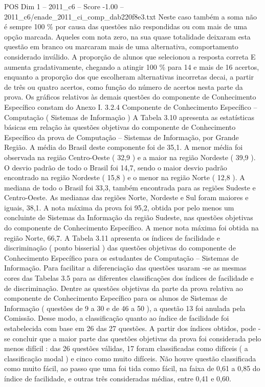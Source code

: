 \begin{textsample}{POS Dim 1 – 2011\_c6 – Score -1.00 – 2011\_c6/enade\_2011\_ci\_comp\_dab220f8e3.txt}
Neste caso também a soma não é sempre 100 \% por causa das questões não respondidas ou com mais de uma opção marcada.
Aqueles com nota zero, na sua quase totalidade deixaram esta questão em branco ou marcaram mais de uma alternativa, comportamento considerado inválido.
A proporção de alunos que selecionou a resposta correta E aumenta gradativamente, chegando a atingir 100 \% para 14 e mais de 16 acertos, enquanto a proporção dos que escolheram alternativas incorretas decai, a partir de três ou quatro acertos, como função do número de acertos nesta parte da prova.
Os gráficos relativos às demais questões do componente de Conhecimento Específico constam do Anexo I. 3.2.4 Componente de Conhecimento Específico – Computação ( Sistemas de Informação ) A Tabela 3.10 apresenta as estatísticas básicas em relação às questões objetivas do componente de Conhecimento Específico da prova de Computação – Sistemas de Informação, por Grande Região.
A média do Brasil deste componente foi de 35,1.
A menor média foi observada na região Centro-Oeste ( 32,9 ) e a maior na região Nordeste ( 39,9 ).
O desvio padrão de todo o Brasil foi 14,7, sendo o maior desvio padrão encontrado na região Nordeste ( 15,8 ) e o menor na região Norte ( 12,8 ).
A mediana de todo o Brasil foi 33,3, também encontrada para as regiões Sudeste e Centro-Oeste.
As medianas das regiões Norte, Nordeste e Sul foram maiores e iguais, 38,1.
A nota máxima da prova foi 95,2, obtida por pelo menos um concluinte de Sistemas da Informação da região Sudeste, nas questões objetivas do componente de Conhecimento Específico.
A menor nota máxima foi obtida na região Norte, 66,7.
A Tabela 3.11 apresenta os índices de facilidade e discriminação ( ponto bisserial ) das questões objetivas do componente de Conhecimento Específico para os estudantes de Computação – Sistemas de Informação.
Para facilitar a diferenciação das questões usaram -se as mesmas cores das Tabelas 3.5 para as diferentes classificações dos índices de facilidade e de discriminação.
Dentre as questões objetivas da parte da prova relativa ao componente de Conhecimento Específico para os alunos de Sistemas de Informação ( questões de 9 a 30 e de 46 a 50 ), a questão 13 foi anulada pela Comissão.
Desse modo, a classificação quanto ao índice de facilidade foi estabelecida com base em 26 das 27 questões.
A partir dos índices obtidos, pode -se concluir que a maior parte das questões objetivas da prova foi considerada pelo menos difícil : das 26 questões válidas, 17 foram classificadas como difíceis ( a classificação modal ) e cinco como muito difíceis.
Não houve questão classificada como muito fácil, ao passo que uma foi tida como fácil, na faixa de 0,61 a 0,85 do índice de facilidade, e outras três consideradas médias, entre 0,41 e 0,60.

\end{textsample}
